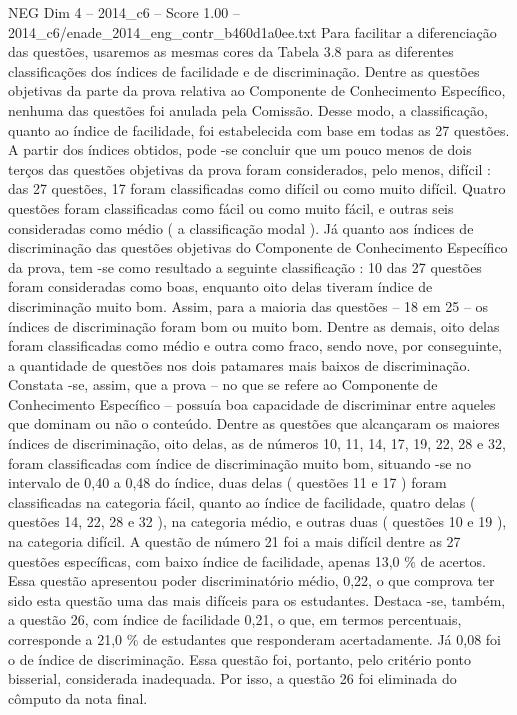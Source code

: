 \begin{textsample}{NEG Dim 4 – 2014\_c6 – Score 1.00 – 2014\_c6/enade\_2014\_eng\_contr\_b460d1a0ee.txt}
Para facilitar a diferenciação das questões, usaremos as mesmas cores da Tabela 3.8 para as diferentes classificações dos índices de facilidade e de discriminação.
Dentre as questões objetivas da parte da prova relativa ao Componente de Conhecimento Específico, nenhuma das questões foi anulada pela Comissão.
Desse modo, a classificação, quanto ao índice de facilidade, foi estabelecida com base em todas as 27 questões.
A partir dos índices obtidos, pode -se concluir que um pouco menos de dois terços das questões objetivas da prova foram considerados, pelo menos, difícil : das 27 questões, 17 foram classificadas como difícil ou como muito difícil.
Quatro questões foram classificadas como fácil ou como muito fácil, e outras seis consideradas como médio ( a classificação modal ).
Já quanto aos índices de discriminação das questões objetivas do Componente de Conhecimento Específico da prova, tem -se como resultado a seguinte classificação : 10 das 27 questões foram consideradas como boas, enquanto oito delas tiveram índice de discriminação muito bom.
Assim, para a maioria das questões – 18 em 25 – os índices de discriminação foram bom ou muito bom.
Dentre as demais, oito delas foram classificadas como médio e outra como fraco, sendo nove, por conseguinte, a quantidade de questões nos dois patamares mais baixos de discriminação.
Constata -se, assim, que a prova – no que se refere ao Componente de Conhecimento Específico – possuía boa capacidade de discriminar entre aqueles que dominam ou não o conteúdo.
Dentre as questões que alcançaram os maiores índices de discriminação, oito delas, as de números 10, 11, 14, 17, 19, 22, 28 e 32, foram classificadas com índice de discriminação muito bom, situando -se no intervalo de 0,40 a 0,48 do índice, duas delas ( questões 11 e 17 ) foram classificadas na categoria fácil, quanto ao índice de facilidade, quatro delas ( questões 14, 22, 28 e 32 ), na categoria médio, e outras duas ( questões 10 e 19 ), na categoria difícil.
A questão de número 21 foi a mais difícil dentre as 27 questões específicas, com baixo índice de facilidade, apenas 13,0 \% de acertos.
Essa questão apresentou poder discriminatório médio, 0,22, o que comprova ter sido esta questão uma das mais difíceis para os estudantes.
Destaca -se, também, a questão 26, com índice de facilidade 0,21, o que, em termos percentuais, corresponde a 21,0 \% de estudantes que responderam acertadamente.
Já 0,08 foi o de índice de discriminação.
Essa questão foi, portanto, pelo critério ponto bisserial, considerada inadequada.
Por isso, a questão 26 foi eliminada do cômputo da nota final.

\end{textsample}
